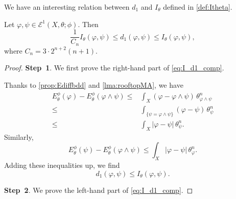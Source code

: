 We have an interesting relation between $d_1$ and $I_{\theta}$ defined in \cref{def:Itheta}.
\begin{theorem}\label{thm:I_d1_comp}
    Let $\varphi,\psi\in \mathcal{E}^1(X,\theta;\phi)$. Then
    \begin{equation}\label{eq:I_d1_comp}
    \frac{1}{C_n} I_{\theta}(\varphi,\psi)\leq d_1(\varphi,\psi)\leq I_{\theta}(\varphi,\psi),
    \end{equation}
    where $C_n=3\cdot 2^{n+2}(n+1)$.
\end{theorem}
\begin{proof}
    \textbf{Step~1}. We first prove the right-hand part of \eqref{eq:I_d1_comp}.

    Thanks to \cref{prop:Ediffbdd} and \cref{lma:rooftopMA}, we have
    \[
    \begin{aligned}
    E_{\theta}^{\phi}(\varphi)-E_{\theta}^{\phi}(\varphi\land \psi)\leq & \int_X (\varphi-\varphi\land\psi)\,\theta_{\varphi\land \psi}^n \\
    \leq & \int_{\{\psi=\varphi\land \psi \}} (\varphi-\psi)\,\theta_{\psi}^n\\
    \leq & \int_X |\varphi-\psi|\,\theta_{\psi}^n.
    \end{aligned}
    \]
    Similarly,
    \[
    E_{\theta}^{\phi}(\psi)-E_{\theta}^{\phi}(\varphi\land \psi)\leq \int_X |\varphi-\psi|\,\theta_{\varphi}^n.
    \]
    Adding these inequalities up, we find
    \[
    d_1(\varphi,\psi)\leq I_{\theta}(\varphi,\psi).
    \]

    \textbf{Step~2}. We prove the left-hand part of \eqref{eq:I_d1_comp}.


\end{proof}
